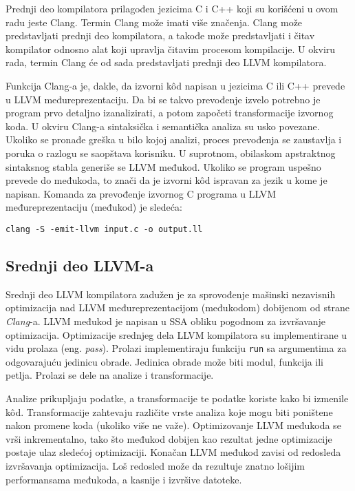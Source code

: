 \documentclass[12pt,oneside]{memoir}
\begin{document}
Prednji deo kompilatora prilagođen jezicima C i C++ koji su korišćeni u ovom radu jeste Clang. Termin Clang može imati više značenja. Clang može predstavljati prednji deo kompilatora, a takođe može predstavljati i čitav kompilator odnosno alat koji upravlja čitavim procesom kompilacije. U okviru rada, termin Clang će od sada predstavljati prednji deo LLVM kompilatora. 

Funkcija Clang-a je, dakle, da izvorni kôd napisan u jezicima C ili C++ prevede u LLVM međureprezentaciju. Da bi se takvo prevođenje izvelo potrebno je program prvo detaljno izanalizirati, a potom započeti transformacije izvornog koda. U okviru Clang-a sintaksička i semantička analiza su usko povezane. Ukoliko se pronađe greška u bilo kojoj analizi, proces prevođenja se zaustavlja i poruka o razlogu se saopštava korisniku. U suprotnom, obilaskom apstraktnog sintaksnog stabla generiše se LLVM međukod. Ukoliko se program uspešno prevede do međukoda, to znači da je izvorni k\^od ispravan za jezik u kome je napisan. Komanda za prevođenje izvornog C programa u LLVM međureprezentaciju (međukod) je sledeća:
\begin{verbatim}
clang -S -emit-llvm input.c -o output.ll
\end{verbatim}

\subsection{Srednji deo LLVM-a}
Srednji deo LLVM kompilatora zadužen je za sprovođenje mašinski nezavisnih optimizacija nad LLVM međureprezentacijom (međukodom) dobijenom od strane \textit{Clang}-a. LLVM međukod je napisan u SSA obliku pogodnom za izvršavanje optimizacija. Optimizacije srednjeg dela LLVM kompilatora su implementirane u vidu prolaza (eng. \textit{pass}). Prolazi implementiraju funkciju \texttt{run} sa argumentima za odgovarajuću jedinicu obrade. Jedinica obrade može biti modul, funkcija ili petlja. Prolazi se dele na analize i transformacije. 

Analize prikupljaju podatke, a transformacije te podatke koriste kako bi izmenile k\^od. 
Transformacije zahtevaju različite vrste analiza koje mogu biti poništene nakon promene koda 
(ukoliko više ne važe). Optimizovanje LLVM međukoda se vrši inkrementalno, tako što međukod dobijen kao rezultat jedne optimizacije postaje ulaz sledećoj optimizaciji. Konačan LLVM međukod zavisi od redosleda izvršavanja optimizacija. Loš redosled može da rezultuje znatno lošijim performansama međukoda, a kasnije i izvršive datoteke.
\end{document}
